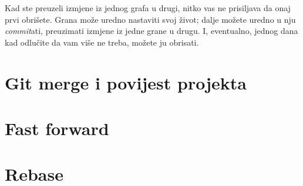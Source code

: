 

Kad ste preuzeli izmjene iz jednog grafa u drugi, nitko vas ne prisiljava da onaj prvi obrišete. 
Grana može uredno nastaviti svoj život; dalje možete uredno u nju \emph{commit}ati, preuzimati izmjene iz jedne grane u drugu.
I, eventualno, jednog dana kad odlučite da vam više ne treba, možete ju obrisati.



\section*{Git merge i povijest projekta}

\section*{Fast forward}

\section*{Rebase}



